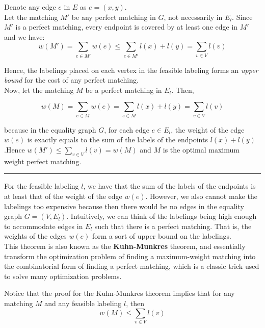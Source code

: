 \documentclass{article}
\newenvironment{proof}{{\bf Proof:}}{\hfill\rule{2mm}{2mm}}
\begin{document}
\begin{proof}
Denote any edge $e$ in $E$ as $e = (x, y)$.\\
Let the matching $M'$ be any perfect matching in $G$, not necessarily in $E_l$. Since $M'$ is a perfect matching, every endpoint is covered by at least one edge in $M'$ and we have:
\begin{equation*}
w(M') = \sum_{e \in M'} w(e) \leq \sum_{e \in M'} l(x) + l(y) = \sum_{v \in V} l(v)
\end{equation*}

Hence, the labelings placed on each vertex in the feasible labeling forms an \textit{upper bound} for the cost of any perfect matching.\\

Now, let the matching $M$ be a perfect matching in $E_l$. Then,

\begin{equation*}
w(M) = \sum_{e \in M} w(e) = \sum_{e \in M} l(x) + l(y) = \sum_{v \in V} l(v)
\end{equation*}

because in the equality graph $G$, for each edge $e \in E_l$, the weight of the edge $w(e)$ is exactly equals to the sum of the labels of the endpoints $l(x) + l(y)$.Hence $w(M') \leq \sum_{v \in V} l(v) = w(M)$ and $M$ is the optimal maximum weight perfect matching.
\end{proof}

For the feasible labeling $l$, we have that the sum of the labels of the endpoints is at least that of the weight of the edge $w(e)$. However, we also cannot make the labelings too expensive because then there would be no edges in the equality graph $G = (V, E_l)$. Intuitively, we can think of the labelings being high enough to accommodate edges in $E_l$ such that there is a perfect matching. That is, the weights of the edges $w(e)$ form a sort of upper bound on the labelings.\\

This theorem is also known as the \textbf{Kuhn-Munkres} theorem, and essentially transform the optimization problem of finding a maximum-weight matching into the combinatorial form of finding a perfect matching, which is a classic trick used to solve many optimization problems.

Notice that the proof for the Kuhn-Munkres theorem implies that for any matching $M$ and any feasible labeling $l$, then 
\begin{equation*}
w(M) \leq \sum_{v \in V} l(v)
\end{equation*}
\end{document}
